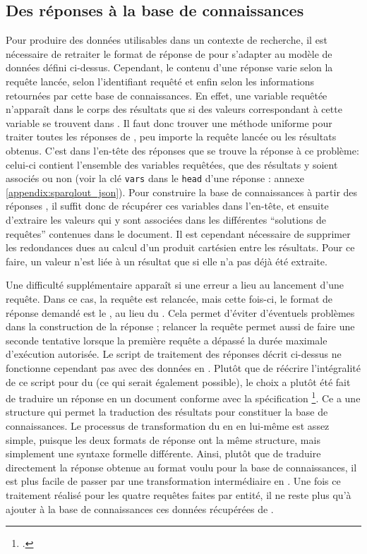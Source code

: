 \subsection{Des réponses \sparql{} à la base de connaissances}
Pour produire des données utilisables dans un contexte de recherche, il est nécessaire de retraiter le format de réponse de \sparql{} pour s'adapter au modèle de données défini ci-dessus. Cependant, le contenu d'une réponse \sparql{} varie selon la requête lancée, selon l'identifiant \wkd{} requêté et enfin selon les informations retournées par cette base de connaissances. En effet, une variable requêtée n'apparaît dans le corps des résultats que si des valeurs correspondant à cette variable se trouvent dans \wkd{}. Il faut donc trouver une méthode uniforme pour traiter toutes les réponses de \sparql{}, peu importe la requête lancée ou les résultats obtenus. C'est dans l'en-tête des réponses que se trouve la réponse à ce problème: celui-ci contient l'ensemble des variables requêtées, que des résultats y soient associés ou non (voir la clé \texttt{vars} dans le \texttt{head} d'une réponse \sparql{}: annexe \ref{appendix:sparqlout_json}). Pour construire la base de connaissances à partir des réponses \sparql{}, il suffit donc de récupérer ces variables dans l'en-tête, et ensuite d'extraire les valeurs qui y sont associées dans les différentes \enquote{solutions de requêtes} contenues dans le document. Il est cependant nécessaire de supprimer les redondances dues au calcul d'un produit cartésien entre les résultats. Pour ce faire, un valeur n'est liée à un résultat que si elle n'a pas déjà été extraite. 

Une difficulté supplémentaire apparaît si une erreur a lieu au lancement d'une requête. Dans ce cas, la requête est relancée, mais cette fois-ci, le format de réponse demandé est le \xml{}, au lieu du \json{}. Cela permet d'éviter d'éventuels problèmes dans la construction de la réponse \json{}; relancer la requête permet aussi de faire une seconde tentative lorsque la première requête a dépassé la durée maximale d'exécution autorisée. Le script de traitement des réponses décrit ci-dessus ne fonctionne cependant pas avec des données en \xml{}. Plutôt que de réécrire l'intégralité de ce script pour du \xml{} (ce qui serait également possible), le choix a plutôt été fait de traduire un réponse \xml{} en un document \json{} conforme avec la spécification \sparql{}\footcite{beckett_sparql_2013}. Ce \json{} a une structure qui permet la traduction des résultats \sparql{} pour constituer la base de connaissances. Le processus de transformation du \xml{} en \json{} en lui-même est assez simple, puisque les deux formats de réponse ont la même structure, mais simplement une syntaxe formelle différente. Ainsi, plutôt que de traduire directement la réponse \sparql{} \xml{} obtenue au format voulu pour la base de connaissances, il est plus facile de passer par une transformation intermédiaire en \json{}. Une fois ce traitement réalisé pour les quatre requêtes faites par entité, il ne reste plus qu'à ajouter à la base de connaissances ces données récupérées de \wkd{}.

